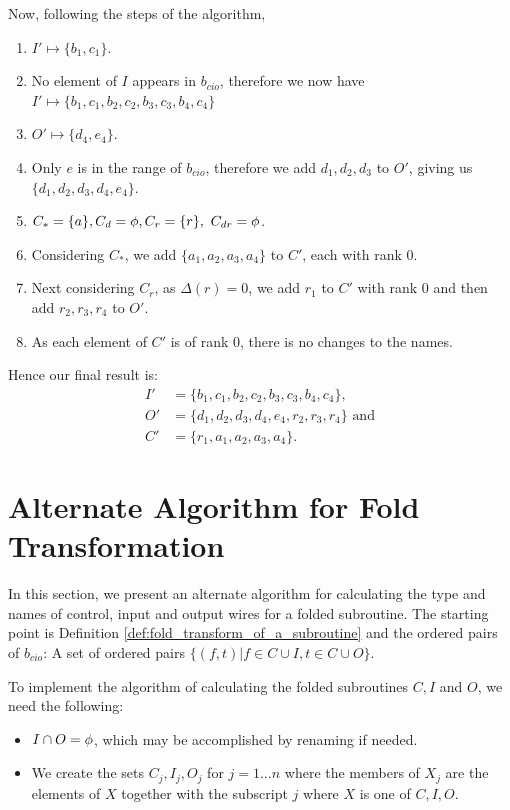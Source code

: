 Now, following the steps of the algorithm,
\begin{enumerate}
  \item $I' \mapsto \{b_1,c_1\}$.
  \item No element of $I$ appears in $b_{cio}$, therefore we now have
    $I' \mapsto \{b_1,c_1,b_2,c_2,b_3,c_3,b_4,c_4\}$
  \item $O' \mapsto \{d_4,e_4\}$.
  \item Only $e$ is in the range of $b_{cio}$, therefore we add
  $d_1,d_2,d_3$ to  $O'$, giving us $\{d_1,d_2,d_3,d_4,e_4\}$.
  \item $C_*=\{a\},C_d=\nothing, C_r = \{r\},\ C_{dr}=\nothing$.
  \item Considering $C_*$, we add $\{a_1,a_2,a_3,a_4\}$ to $C'$, each with
    rank 0.
  \item Next considering $C_r$, as $\Delta(r)=0$, we add $r_1$ to $C'$ with
    rank 0 and then add $r_2,r_3,r_4$ to $O'$.
  \item As each element of $C'$ is of rank 0, there is no changes
    to the names.
\end{enumerate}

Hence our final result is:
\begin{align*}
  I'&=\{b_1,c_1,b_2,c_2,b_3,c_3,b_4,c_4\},\\
  O'&=\{d_1,d_2,d_3,d_4,e_4,r_2,r_3,r_4\}\text{ and}\\
  C'&=\{r_1,a_1,a_2,a_3,a_4\}.
\end{align*}


\section{Alternate Algorithm for Fold Transformation} %
\label{sec:alternate_algorithm_for_fold_transformation}
In  this section, we present an alternate algorithm for calculating the
type and names of control, input and output wires for a folded
subroutine.  The starting point is Definition
\ref{def:fold_transform_of_a_subroutine}
and the ordered pairs of $b_{cio}$: A set of ordered pairs
$\{(f,t)|f\in C\cup I, t \in C\cup O\}$.

To implement the algorithm of calculating the folded subroutines $C,I$ and
$O$, we need the following:
\begin{itemize}
  \item $I\cap O = \phi$, which may be accomplished by renaming if needed.
  \item We create the sets $C_j,I_j,O_j$ for $j=1\ldots n$ where the members
    of $X_j$ are the elements of $X$ together with the subscript $j$ where
    $X$ is one of $C,I,O$.
\end{itemize}


